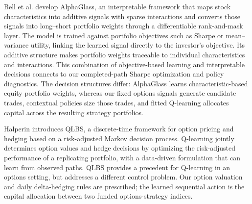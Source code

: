 \documentclass[11pt,letterpaper]{article}
\begin{document}
Bell et al. \cite{alphaglass2026} develop AlphaGlass, an interpretable framework that maps stock characteristics into additive signals with sparse interactions and converts those signals into long--short portfolio weights through a differentiable rank-and-mask layer. The model is trained against portfolio objectives such as Sharpe or mean--variance utility, linking the learned signal directly to the investor's objective. Its additive structure makes portfolio weights traceable to individual characteristics and interactions. This combination of objective-based learning and interpretable decisions connects to our completed-path Sharpe optimization and policy diagnostics. The decision structures differ: AlphaGlass learns characteristic-based equity portfolio weights, whereas our fixed options signals generate candidate trades, contextual policies size those trades, and fitted Q-learning allocates capital across the resulting strategy portfolios.

Halperin \cite{halperin2017qlbs} introduces QLBS, a discrete-time framework for option pricing and hedging based on a risk-adjusted Markov decision process. Q-learning jointly determines option values and hedge decisions by optimizing the risk-adjusted performance of a replicating portfolio, with a data-driven formulation that can learn from observed paths. QLBS provides a precedent for Q-learning in an options setting, but addresses a different control problem. Our option valuation and daily delta-hedging rules are prescribed; the learned sequential action is the capital allocation between two funded options-strategy indices.









\clearpage
\appendix
\begingroup
\renewcommand{\baselinestretch}{1}
\fontsize{10.5}{12.8}\selectfont




\endgroup
\end{document}
